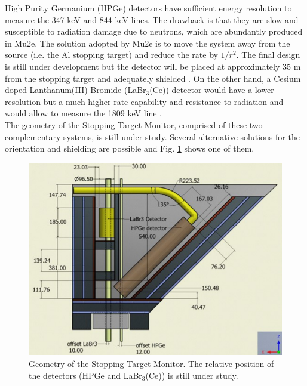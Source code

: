 \documentclass[12pt,a4paper,openright, oneside, titlepage]{book} %
\begin{document}
\noindent
High Purity Germanium (HPGe) detectors have sufficient energy resolution to measure the 347 keV and 844 keV lines. 
The drawback is that they are slow and susceptible to radiation damage due to neutrons, which are abundantly produced in Mu2e.
The solution adopted by Mu2e is to move the system away from the source (i.e. the Al stopping target) and reduce the rate by $1/r^2$. 
The final design is still under development but the detector will be placed at approximately 35 m from the stopping target and adequately shielded \cite{STM:2016}. 
On the other hand, a Cesium doped Lanthanum(III) Bromide (LaBr$_3$(Ce)) detector would have a lower resolution but a much higher rate capability and resistance to radiation and would allow to measure the 1809 keV line \cite{LaBr3:2020}.\\
The geometry of the Stopping Target Monitor, comprised of these two complementary systems, is still under study. 
Several alternative solutions for the orientation and shielding are possible and Fig. \ref{_STM_geom} shows one of them.

\begin{figure}[h!]
\centering
\includegraphics[scale=0.6]{STM_geom}
\caption[Geometry of the Stopping Target Monitor]{Geometry of the Stopping Target Monitor. The relative position of the detectors (HPGe and LaBr$_3$(Ce)) is still under study.}
\label{_STM_geom}
\end{figure}
\end{document}
